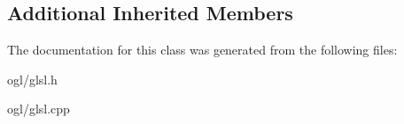 \subsection*{Additional Inherited Members}


The documentation for this class was generated from the following files\+:\begin{DoxyCompactItemize}
\item 
ogl/glsl.\+h\item 
ogl/glsl.\+cpp\end{DoxyCompactItemize}
